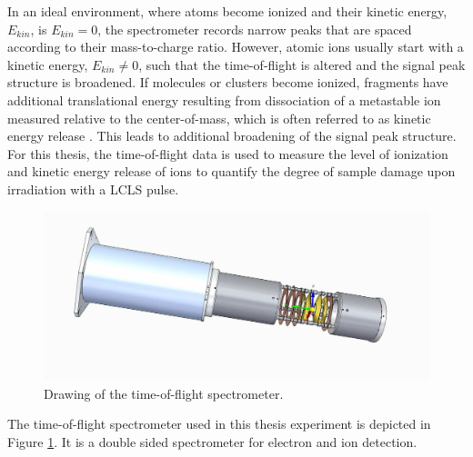 In an ideal environment, where atoms become ionized and their kinetic energy, $E_{kin}$, is $E_{kin}=0$, the spectrometer records narrow peaks that are spaced according to their mass-to-charge ratio. However, atomic ions usually start with a kinetic energy, $E_{kin}\neq 0$, such that the time-of-flight is altered and the signal peak structure is broadened. If molecules or clusters become ionized, fragments have additional translational energy resulting from dissociation of a metastable ion measured relative to the center-of-mass, which is often referred to as kinetic energy release \citep{Murray-2013-IUPAC}. This leads to additional broadening of the signal peak structure.
For this thesis, the time-of-flight data is used to measure the level of ionization and kinetic energy release of ions to quantify the degree of sample damage upon irradiation with a LCLS pulse.\\[1\baselineskip]
\begin{figure}
   \includegraphics[width=1.\linewidth]{images/spectrometer.jpg}
    \caption{Drawing of the time-of-flight spectrometer.}
\label{fig:spectrometer-detail}
\end{figure}
The time-of-flight spectrometer used in this thesis experiment is depicted in Figure \ref{fig:spectrometer-detail}. It is a double sided spectrometer for electron and ion detection. %

